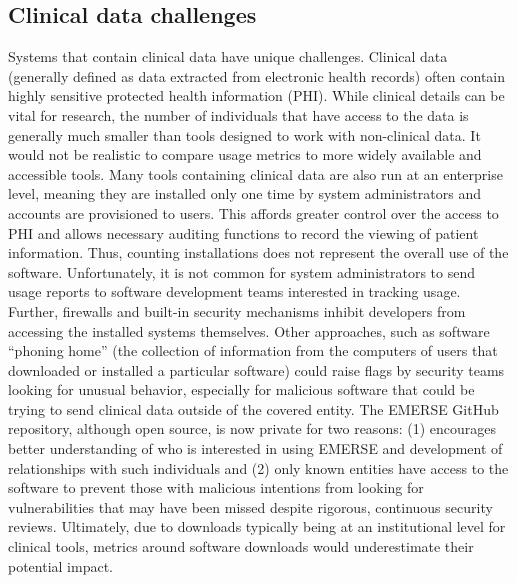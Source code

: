 \documentclass{article}
\begin{document}
\subsection{Clinical data challenges}

Systems that contain clinical data have unique challenges.  Clinical data (generally defined as data extracted from electronic health records) often contain highly sensitive protected health information (PHI). While clinical details can be vital for research, the number of individuals that have access to the data is generally much smaller than tools designed to work with non-clinical data. It would not be realistic to compare usage metrics to more widely available and accessible tools. Many tools containing clinical data are also run at an enterprise level, meaning they are installed only one time by system administrators and accounts are provisioned to users. This affords greater control over the access to PHI and allows necessary auditing functions to record the viewing of patient information.  Thus, counting installations does not represent the overall use of the software. Unfortunately, it is not common for system administrators to send usage reports to software development teams interested in tracking usage.  Further, firewalls and built-in security mechanisms inhibit developers from accessing the installed systems themselves. Other approaches, such as software “phoning home” (the collection of information from the computers of users that downloaded or installed a particular software) could raise flags by security teams looking for unusual behavior, especially for malicious software that could be trying to send clinical data outside of the covered entity. The EMERSE \cite{hanauer_supporting_2015} GitHub repository, although open source, is now private for two reasons: (1) encourages  better understanding of who is interested in using EMERSE and development of relationships with such individuals and (2)  only known entities have access to the software to prevent those with malicious intentions from looking for vulnerabilities that may have been missed despite rigorous, continuous security reviews.  Ultimately, due to downloads typically being at an institutional level for clinical tools, metrics around software downloads would underestimate their potential impact.  
\end{document}
